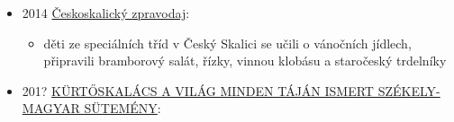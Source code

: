\begin{itemize}
\begin{itemize}
    \begin{itemize}
    \tightlist
    \item
      oheň musí bejt dost silnej, jinak těsto překyne a bude z válečku
      opadávat
    \item
      Staré obřadní pečivo se původně připravovalo na dřevěné válečkové
      formě trdelníku či trdle na otevřeném ohništi
    \end{itemize}
  \end{itemize}
\item
  2014
  \href{https://ceskadigitalniknihovna.cz/uuid/uuid:a07eb793-2212-4764-9edc-25f44e6931a3}{Českoskalický
  zpravodaj}:

  \begin{itemize}
  \tightlist
  \item
    děti ze speciálních tříd v Český Skalici se učili o vánočních
    jídlech, připravili bramborový salát, řízky, vinnou klobásu a
    staročeský trdelníky
  \end{itemize}
\item
  201?
  \href{https://web.archive.org/web/20201230130310/https://www.kurtos.eu/dl/kurtos_konyv.pdf}{KÜRTŐSKALÁCS
  A VILÁG MINDEN TÁJÁN ISMERT SZÉKELY-MAGYAR SÜTEMÉNY}:


\end{itemize}
